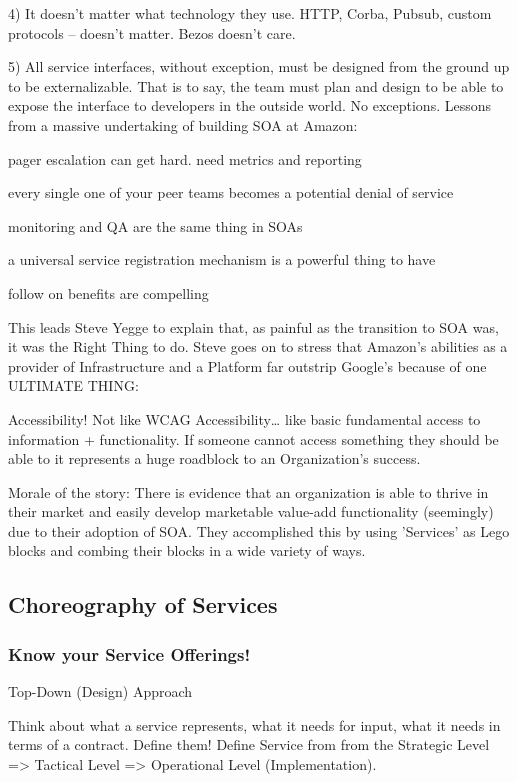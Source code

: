 \documentclass{article}
\begin{document}
4) It doesn't matter what technology they use. HTTP, Corba, Pubsub, custom protocols -- doesn't matter. Bezos doesn't care.

5) All service interfaces, without exception, must be designed from the ground up to be externalizable. That is to say, the team must plan and design to be able to expose the interface to developers in the outside world. No exceptions.
Lessons from a massive undertaking of building SOA at Amazon:

pager escalation can get hard.  need metrics and reporting

every single one of your peer teams becomes a potential denial of service

monitoring and QA are the same thing in SOAs

a universal service registration mechanism is a powerful thing to have

follow on benefits are compelling

This leads Steve Yegge to explain that, as painful as the transition to SOA was, it was the Right Thing to do.  Steve goes on to stress that Amazon's abilities as a provider of Infrastructure and a Platform far outstrip Google's because of one ULTIMATE THING:

Accessibility!  Not like WCAG Accessibility… like basic fundamental access to information + functionality.  If someone cannot access something they should be able to it represents a huge roadblock to an Organization's success.

Morale of the story:  There is evidence that an organization is able to thrive in their market and easily develop marketable value-add functionality (seemingly) due to their adoption of SOA.  They accomplished this by using 'Services' as Lego blocks and combing their blocks in a wide variety of ways.

\subsection{Choreography of Services}
\subsubsection{Know your Service Offerings!}
Top-Down (Design) Approach

Think about what a service represents, what it needs for input, what it needs in terms of a contract.  Define them!
Define Service from from the Strategic Level => Tactical Level => Operational Level (Implementation).
\end{document}
